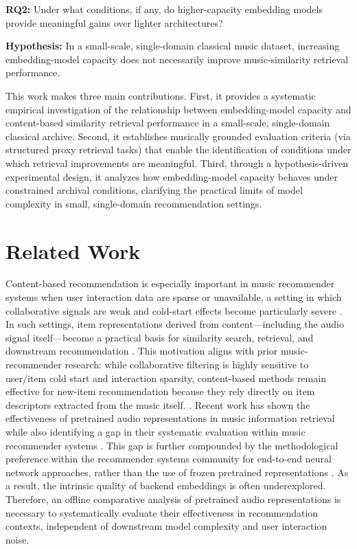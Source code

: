 \documentclass{article}
\begin{document}
\noindent\textbf{RQ2:} Under what conditions, if any, do higher-capacity embedding models provide
meaningful gains over lighter architectures?

\noindent\textbf{Hypothesis:} In a small-scale, single-domain classical music dataset, increasing
embedding-model capacity does not necessarily improve music-similarity retrieval performance.

\smallskip
This work makes three main contributions. First, it provides a systematic empirical investigation of
the relationship between embedding-model capacity and content-based similarity retrieval performance
in a small-scale, single-domain classical archive. Second, it establishes musically grounded
evaluation criteria (via structured proxy retrieval tasks) that enable the identification of
conditions under which retrieval improvements are meaningful. Third, through a hypothesis-driven
experimental design, it analyzes how embedding-model capacity behaves under constrained archival
conditions, clarifying the practical limits of model complexity in small, single-domain
recommendation settings.












\section{Related Work}\label{sec:related-work}

Content-based recommendation is especially important in music recommender systems when user interaction data are sparse or unavailable, a setting in which collaborative signals are weak and cold-start effects become particularly severe \cite{schedl2015musicrec, schedl2018, deldjoo2024}. In such settings, item representations derived from content---including the audio signal itself---become a practical basis for similarity search, retrieval, and downstream recommendation \cite{schedl2015musicrec, deldjoo2024}. 
This motivation aligns with prior music-recommender research: while collaborative filtering is highly sensitive to user/item cold start and interaction sparsity, content-based methods remain effective for new-item recommendation because they rely directly on item descriptors extracted from the music itself. \cite{schedl2018, schedl2015musicrec}.
Recent work has shown the effectiveness of pretrained audio representations in music information retrieval while also identifying a gap in their systematic evaluation within music recommender systems \cite{tamm2024}. This gap is further compounded by the methodological preference within the recommender systems community for end-to-end neural network approaches, rather than the use of frozen pretrained representations \cite{tamm2024}.
As a result, the intrinsic quality of backend embeddings is often underexplored.
Therefore, an offline comparative analysis of pretrained audio representations is necessary to systematically evaluate their effectiveness in recommendation contexts, independent of downstream model complexity and user interaction noise.
\end{document}

